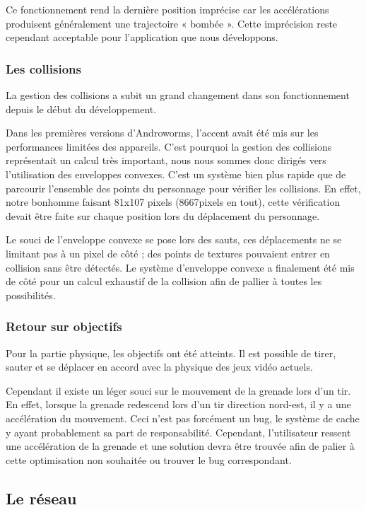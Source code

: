 \documentclass{report}
\begin{document}
Ce fonctionnement rend la dernière position imprécise car les accélérations produisent généralement une trajectoire « bombée ». Cette imprécision reste cependant acceptable pour l’application que nous développons.

\subsubsection{Les collisions}
La gestion des collisions a subit un grand changement dans son fonctionnement depuis le début du développement.

Dans les premières versions d’Androworms, l’accent avait été mis sur les performances limitées des appareils. C’est pourquoi la gestion des collisions représentait un calcul très important, nous nous sommes donc dirigés vers l’utilisation des enveloppes convexes. C’est un système bien plus rapide que de parcourir l’ensemble des points du personnage pour vérifier les collisions. En effet, notre bonhomme faisant 81x107 pixels (8667pixels en tout), cette vérification devait être faite sur chaque position lors du déplacement du personnage. 

Le souci de l’enveloppe convexe se pose lors des sauts, ces déplacements ne se limitant pas à un pixel de côté ; des points de textures pouvaient entrer en collision sans être détectés. 
Le système d’enveloppe convexe a finalement été mis de côté pour un calcul exhaustif de la collision afin de pallier à toutes les possibilités.

\subsubsection{Retour sur objectifs}

Pour la partie physique, les objectifs ont été atteints. Il est possible de tirer, sauter et se déplacer en accord avec la physique des jeux vidéo actuels. 

Cependant il existe un léger souci sur le mouvement de la grenade lors d’un tir. En effet, lorsque la grenade redescend lors d’un tir direction nord-est, il y a une accélération du mouvement. Ceci n’est pas forcément un bug, le système de cache y ayant probablement sa part de responsabilité. Cependant, l’utilisateur ressent une accélération de la grenade et une solution devra être trouvée afin de palier à cette optimisation non souhaitée ou trouver le bug correspondant.


\subsection{Le réseau}
\end{document}
